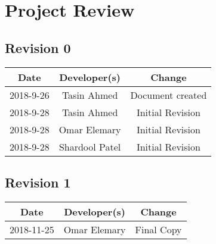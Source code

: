 \documentclass{article}
\begin{document}
\section{Project Review}
\subsection{Revision 0}

\begin{center}
	\begin{tabular}{ccc}
		\hline 
		Date & Developer(s) & Change \\ 
		\hline 
		2018-9-26 & Tasin Ahmed & Document created \\ 
		2018-9-28 & Tasin Ahmed & Initial Revision  \\
		2018-9-28 & Omar Elemary & Initial Revision  \\ 
		2018-9-28 & Shardool Patel & Initial Revision  \\  
		\hline 
	\end{tabular} 
\end{center}

\subsection{Revision 1}
\begin{center}
	\begin{tabular}{ccc}
		\hline 
		Date & Developer(s) & Change \\ 
		\hline 
		2018-11-25 & Omar Elemary & Final Copy \\
		\hline 
	\end{tabular} 
\end{center}
\end{document}
